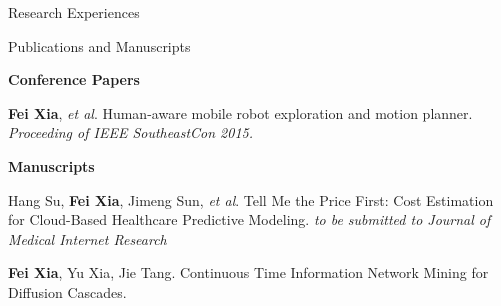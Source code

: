 \documentclass{resume} %
\begin{document}
\begin{rSection}{Research Experiences}





\end{rSection}

\begin{rSection}{Publications and Manuscripts}
\begin{enumerate}[label={[}\arabic*{]}]
\setlength\itemsep{-0.5em}
\item[] {\bf Conference Papers}
	\item {\bf Fei Xia}, {\it et al}. Human-aware mobile robot exploration and motion planner. {\it Proceeding of IEEE SoutheastCon 2015.}	
\item[] {\bf Manuscripts}
	\item Hang Su, {\bf Fei Xia}, Jimeng Sun, {\it et al}. Tell Me the Price First: Cost Estimation for Cloud-Based Healthcare Predictive Modeling. {\it to be submitted to Journal of Medical Internet Research}
	\item {\bf Fei Xia}, Yu Xia, Jie Tang. Continuous Time Information Network Mining for Diffusion Cascades. 	
\end{enumerate}

\end{rSection}
\end{document}
